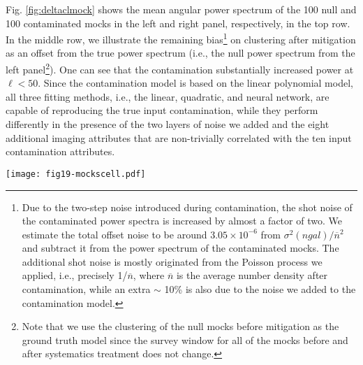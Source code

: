 Fig. \ref{fig:deltaclmock} shows the mean angular power spectrum of the 100 null and 100 contaminated mocks in the left and right panel, respectively, in the top row. In the middle row, we illustrate the remaining bias\footnote{Due to the two-step noise introduced during contamination, the shot noise of the contaminated power spectra is increased by almost a factor of two. We estimate the total offset noise to be around $3.05\times10^{-6}$ from $\sigma^2(ngal)/\overline{n}^2$ and subtract it from the power spectrum of the contaminated mocks. The additional shot noise is mostly originated from the Poisson process we applied, i.e., precisely 1/$\overline{n}$, where $\overline{n}$ is the average number density after contamination, while an extra $\sim$ 10\% is also due to the noise we added to the contamination model.} on clustering after mitigation as an offset from the true power spectrum (i.e., the null power spectrum from the left panel\footnote{Note that we use the clustering of the null mocks before mitigation as the ground truth model since the survey window for all of the mocks before and after systematics treatment does not change.}). One can see that the contamination substantially increased power at $\ell < 50$. Since the contamination model is based on the linear polynomial model, all three fitting methods, i.e., the linear, quadratic, and neural network, are capable of reproducing the true input contamination, while they perform differently in the presence of the two layers of noise we added and the eight additional imaging attributes that are non-trivially correlated with the ten input contamination attributes. \\
\begin{figure*}
\centering
\texttt{[image: fig19-mockscell.pdf]}
\caption{\textit{Top row}: The mean angular power spectrum of the 100 contaminated (null) mocks in the right (left) panel. \textit{Middle row}: The mean power spectrum subtracted by the mean of the null mocks to better visualize the remaining bias after each mitigation. The dark grey shaded region shows the 1$-\sigma$ confidence region of the mean of 100 mocks, while the light grey area shows the 1$-\sigma$ confidence region for one mock, calculated from the dispersion of 100 mocks. To account for the increased shot noise during contamination, we remove the same constant power from all contaminated/mitigated power spectra until their small scale power matches that of the null mock power spectrum. We quantify the significance of the remaining bias by calculating $\chi^2$, the sum of the squared offset weighted with the diagonal variance of the mean $C_\ell$ of null mocks over the last six bins ($\ell~\geq 12$). The middle panel on the left illustrates the neural network without feature selection (`plain') tends to remove the cosmological clustering signal. \label{fig:deltaclmock}}
\end{figure*}

